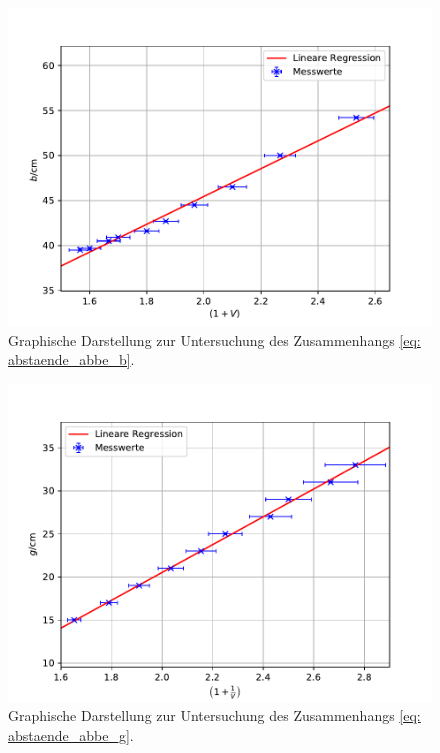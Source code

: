 \begin{figure}
  \centering
  \includegraphics[width = \textwidth]{../Messdaten/plots/abbe_plot_b.pdf}
  \caption{Graphische Darstellung zur Untersuchung des Zusammenhangs \eqref{eq: abstaende_abbe_b}.}
  \label{fig: abbe_b}
\end{figure}

\begin{figure}
  \centering
  \includegraphics[width = \textwidth]{../Messdaten/plots/abbe_plot_g.pdf}
  \caption{Graphische Darstellung zur Untersuchung des Zusammenhangs \eqref{eq: abstaende_abbe_g}.} %
  \label{fig: abbe_g}
\end{figure}


